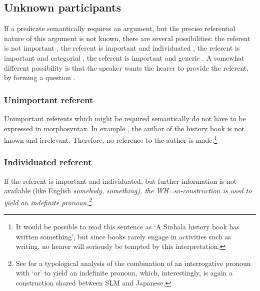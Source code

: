 \subsection{Unknown participants}\label{sec:func:Unknownparticipants}
If a predicate semantically requires an argument, but the precise referential nature of this argument is not known, there are several possibilities: the referent is not important , the referent is important and individuated , the referent is important and categorial , the referent is important and generic . A somewhat different possibility is that the speaker wants the hearer to provide the referent, by forming a question .

\subsubsection{Unimportant referent}\label{sec:func:Unimportantreferent}


Unimportant referents which might be required semantically do not have to be expressed in morphosyntax.
In example , the author of the history book is not known and irrelevant. Therefore, no reference to the author is made.\footnote{It would be possible to read this sentence as `A Sinhala history book has written something', but since books rarely engage in activities such as writing, no hearer will seriously be tempted by this interpretation.}




\subsubsection{Individuated referent}\label{sec:func:Individuatedreferent}
If the referent is important and  individuated, but further information is not available (like English \em somebody, something\em), the WH=\em so\em-construction  is used to yield an indefinite pronoun.\footnote{See \citet[164]{Haspelmath1997indefinite} for a typological analysis of the combination of an interrogative pronoun with `or' to yield an indefinite pronoun, which, interestingly, is again a construction shared between SLM and Japanese.}

